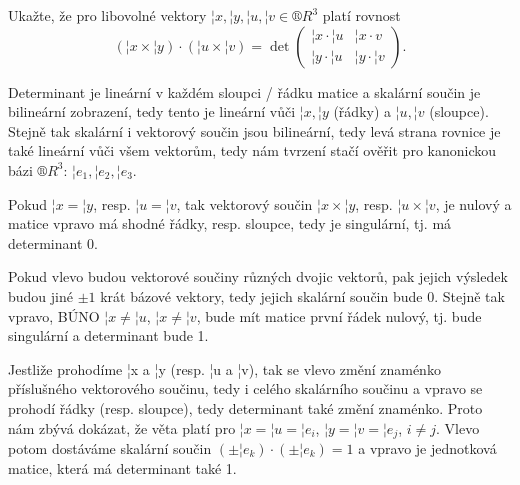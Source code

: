 \documentclass[12pt]{article}                   %
\begin{document}
\begin{priklad}[4.2]
    Ukažte, že pro libovolné vektory $¦x, ¦y, ¦u, ¦v \in ®R^3$ platí rovnost
    $$ (¦x \times ¦y)·(¦u \times ¦v) = \det \begin{pmatrix} ¦x·¦u & ¦x·v \\ ¦y·¦u & ¦y·¦v \end{pmatrix}. $$

    \begin{dukazin}
        Determinant je lineární v každém sloupci / řádku matice a skalární součin je bilineární zobrazení, tedy tento je lineární vůči $¦x, ¦y$ (řádky) a $¦u, ¦v$ (sloupce). Stejně tak skalární i vektorový součin jsou bilineární, tedy levá strana rovnice je také lineární vůči všem vektorům, tedy nám tvrzení stačí ověřit pro kanonickou bázi $®R^3$: $¦e_1, ¦e_2, ¦e_3$.

        Pokud $¦x = ¦y$, resp. $¦u = ¦v$, tak vektorový součin $¦x \times ¦y$, resp. $¦u \times ¦v$, je nulový a matice vpravo má shodné řádky, resp. sloupce, tedy je singulární, tj. má determinant 0.

        Pokud vlevo budou vektorové součiny různých dvojic vektorů, pak jejich výsledek budou jiné $±1$ krát bázové vektory, tedy jejich skalární součin bude 0. Stejně tak vpravo, BÚNO $¦x ≠ ¦u$, $¦x ≠ ¦v$, bude mít matice první řádek nulový, tj. bude singulární a determinant bude 1.

        Jestliže prohodíme ¦x a ¦y (resp. ¦u a ¦v), tak se vlevo změní znaménko příslušného vektorového součinu, tedy i celého skalárního součinu a vpravo se prohodí řádky (resp. sloupce), tedy determinant také změní znaménko. Proto nám zbývá dokázat, že věta platí pro $¦x = ¦u = ¦e_i$, $¦y = ¦v = ¦e_j$, $i ≠ j$. Vlevo potom dostáváme skalární součin $(±¦e_k)·(±¦e_k) = 1$ a vpravo je jednotková matice, která má determinant také 1.
    \end{dukazin}
\end{priklad}

\pagebreak
\end{document}
